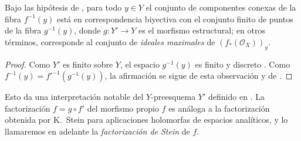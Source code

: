 \begin{corollary}[4.3.3]
\label{III.4.3.3}
\label{III.4.3.3-fr}
Bajo las hipótesis de \textup{}, para todo $y\in Y$ el conjunto
de componentes conexas de la fibra $f^{-1}(y)$ está en correspondencia
biyectiva con el conjunto finito de puntos de la fibra
$g^{-1}(y)$, donde $g:Y'\to Y$ es el morfismo estructural; en otros
términos, corresponde al conjunto de \emph{ideales maximales} de
$(f_*(\mathcal O_X))_y$.
\end{corollary}

\begin{proof}
Como $Y'$ es finito sobre $Y$, el espacio $g^{-1}(y)$ es finito y
discreto . Como
$f^{-1}(y)=f'^{-1}(g^{-1}(y))$,
la afirmación se sigue de esta observación y de
.
\end{proof}

Esto da una interpretación notable del $Y$-preesquema $Y'$ definido en
. La factorización
$f=g\circ f'$ del morfismo propio $f$ es análoga a la factorización
obtenida por K.~Stein para aplicaciones holomorfas de espacios
analíticos, y lo llamaremos en adelante la \emph{factorización de Stein}
de $f$.

